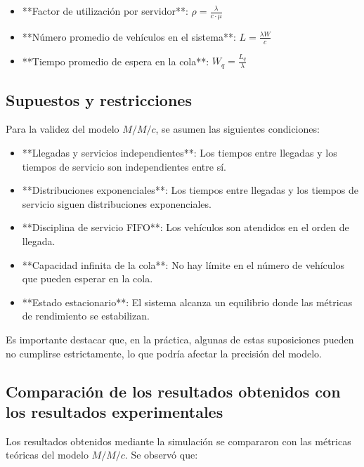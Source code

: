 \documentclass[12pt]{article}
\begin{document}
    \begin{itemize}
        \item **Factor de utilización por servidor**: \( \rho = \frac{\lambda}{c \cdot \mu} \)
        \item **Número promedio de vehículos en el sistema**: \( L = \frac{\lambda W}{c} \)
        \item **Tiempo promedio de espera en la cola**: \( W_q = \frac{L_q}{\lambda} \)
    \end{itemize}
    
    \subsection{Supuestos y restricciones}
    
    Para la validez del modelo \( M/M/c \), se asumen las siguientes condiciones:
    
    \begin{itemize}
        \item **Llegadas y servicios independientes**: Los tiempos entre llegadas y los tiempos de servicio son independientes entre sí.
        \item **Distribuciones exponenciales**: Los tiempos entre llegadas y los tiempos de servicio siguen distribuciones exponenciales.
        \item **Disciplina de servicio FIFO**: Los vehículos son atendidos en el orden de llegada.
        \item **Capacidad infinita de la cola**: No hay límite en el número de vehículos que pueden esperar en la cola.
        \item **Estado estacionario**: El sistema alcanza un equilibrio donde las métricas de rendimiento se estabilizan.
    \end{itemize}
    
    Es importante destacar que, en la práctica, algunas de estas suposiciones pueden no cumplirse estrictamente, lo que podría afectar la precisión del modelo.
    
    \subsection{Comparación de los resultados obtenidos con los resultados experimentales}
    
    Los resultados obtenidos mediante la simulación se compararon con las métricas teóricas del modelo \( M/M/c \). Se observó que:
    
\end{document}
